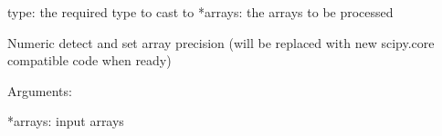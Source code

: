 \documentclass[a4paper,11pt,english]{sphinxmanual}
\begin{document}
\begin{fulllineitems}
\begin{fulllineitems}
type: the required type to cast to
*arrays: the arrays to be processed

\end{fulllineitems}


\begin{fulllineitems}
\label{modules_doc:cbmpy.PyscesStoich.MathArrayFunc.commonType}
Numeric detect and set array precision (will be replaced with new scipy.core compatible code when ready)

Arguments:

*arrays: input arrays

\end{fulllineitems}


\end{fulllineitems}

\end{document}
